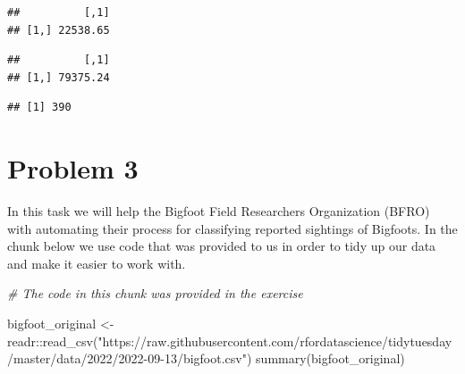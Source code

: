 \documentclass[
]{article}
\newenvironment{Shaded}{\begin{snugshade}}{\end{snugshade}}
\newcommand{\CommentTok}[1]{\textcolor[rgb]{0.56,0.35,0.01}{\textit{#1}}}
\newcommand{\DecValTok}[1]{\textcolor[rgb]{0.00,0.00,0.81}{#1}}
\newcommand{\FunctionTok}[1]{\textcolor[rgb]{0.00,0.00,0.00}{#1}}
\newcommand{\NormalTok}[1]{#1}
\newcommand{\OtherTok}[1]{\textcolor[rgb]{0.56,0.35,0.01}{#1}}
\newcommand{\SpecialCharTok}[1]{\textcolor[rgb]{0.00,0.00,0.00}{#1}}
\newcommand{\StringTok}[1]{\textcolor[rgb]{0.31,0.60,0.02}{#1}}
\begin{document}
\begin{verbatim}
##          [,1]
## [1,] 22538.65
\end{verbatim}

\begin{Shaded}
\end{Shaded}

\begin{verbatim}
##          [,1]
## [1,] 79375.24
\end{verbatim}

\begin{Shaded}
\end{Shaded}

\begin{verbatim}
## [1] 390
\end{verbatim}

\hypertarget{problem-3}{%
\section{Problem 3}\label{problem-3}}

In this task we will help the Bigfoot Field Researchers Organization
(BFRO) with automating their process for classifying reported sightings
of Bigfoots. In the chunk below we use code that was provided to us in
order to tidy up our data and make it easier to work with.

\begin{Shaded}
\begin{Highlighting}[]
\CommentTok{\# The code in this chunk was provided in the exercise}

\NormalTok{bigfoot\_original }\OtherTok{\textless{}{-}}\NormalTok{ readr}\SpecialCharTok{::}\FunctionTok{read\_csv}\NormalTok{(}\StringTok{"https://raw.githubusercontent.com/rfordatascience/tidytuesday/master/data/2022/2022{-}09{-}13/bigfoot.csv"}\NormalTok{)}
\FunctionTok{summary}\NormalTok{(bigfoot\_original)}
\end{Highlighting}
\end{Shaded}
\end{document}
